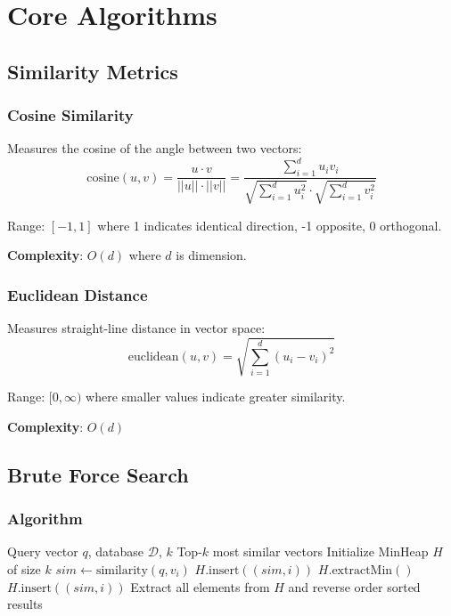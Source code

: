 \documentclass[12pt,a4paper]{article}
\begin{document}
\section{Core Algorithms}

\subsection{Similarity Metrics}

\subsubsection{Cosine Similarity}
Measures the cosine of the angle between two vectors:
\begin{equation}
\text{cosine}(u, v) = \frac{u \cdot v}{||u|| \cdot ||v||} = \frac{\sum_{i=1}^{d} u_i v_i}{\sqrt{\sum_{i=1}^{d} u_i^2} \cdot \sqrt{\sum_{i=1}^{d} v_i^2}}
\end{equation}

Range: $[-1, 1]$ where 1 indicates identical direction, -1 opposite, 0 orthogonal.

\textbf{Complexity}: $O(d)$ where $d$ is dimension.

\subsubsection{Euclidean Distance}
Measures straight-line distance in vector space:
\begin{equation}
\text{euclidean}(u, v) = \sqrt{\sum_{i=1}^{d} (u_i - v_i)^2}
\end{equation}

Range: $[0, \infty)$ where smaller values indicate greater similarity.

\textbf{Complexity}: $O(d)$

\subsection{Brute Force Search}

\subsubsection{Algorithm}
\begin{algorithm}
\caption{Brute Force k-NN Search}
\begin{algorithmic}[1]
\Require Query vector $q$, database $\mathcal{D}$, $k$
\Ensure Top-$k$ most similar vectors
\State Initialize MinHeap $H$ of size $k$
    \State $sim \gets \text{similarity}(q, v_i)$
        \State $H.\text{insert}((sim, i))$
        \State $H.\text{extractMin}()$
        \State $H.\text{insert}((sim, i))$
    \EndIf
\EndFor
\State Extract all elements from $H$ and reverse order
\State \Return sorted results
\end{algorithmic}
\end{algorithm}
\end{document}
